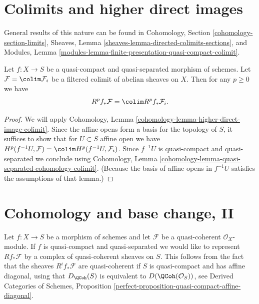 \section{Colimits and higher direct images}
\label{section-colimits}

\noindent
General results of this nature can be found in
Cohomology, Section \ref{cohomology-section-limits},
Sheaves, Lemma \ref{sheaves-lemma-directed-colimits-sections}, and
Modules, Lemma \ref{modules-lemma-finite-presentation-quasi-compact-colimit}.

\begin{lemma}
\label{lemma-colimit-cohomology}
Let $f : X \to S$ be a quasi-compact and quasi-separated morphism of schemes.
Let $\mathcal{F} = \colim \mathcal{F}_i$ be a filtered colimit
of abelian sheaves on $X$. Then for any $p \geq 0$ we have
$$
R^pf_*\mathcal{F} = \colim R^pf_*\mathcal{F}_i.
$$
\end{lemma}

\begin{proof}
We will apply Cohomology, Lemma
\ref{cohomology-lemma-higher-direct-image-colimit}.
Since the affine opens form a basis for the topology of $S$,
it suffices to show that for $U \subset S$ affine open we have
$H^p(f^{-1}U, \mathcal{F}) = \colim H^p(f^{-1}U, \mathcal{F}_i)$.
Since $f^{-1}U$ is quasi-compact and quasi-separated we conclude
using
Cohomology, Lemma \ref{cohomology-lemma-quasi-separated-cohomology-colimit}.
(Because the basis of affine opens in $f^{-1}U$
satisfies the assumptions of that lemma.)
\end{proof}










\section{Cohomology and base change, II}
\label{section-cohomology-and-base-change-derived}

\noindent
Let $f : X \to S$ be a morphism of schemes and let $\mathcal{F}$
be a quasi-coherent $\mathcal{O}_X$-module. If $f$ is quasi-compact
and quasi-separated we would like to represent $Rf_*\mathcal{F}$
by a complex of quasi-coherent sheaves on $S$. This follows
from the fact that the sheaves $R^if_*\mathcal{F}$ are quasi-coherent
if $S$ is quasi-compact and has affine diagonal,
using that $D_\QCoh(S)$ is equivalent to
$D(\QCoh(\mathcal{O}_S))$, see
Derived Categories of Schemes, Proposition
\ref{perfect-proposition-quasi-compact-affine-diagonal}.

